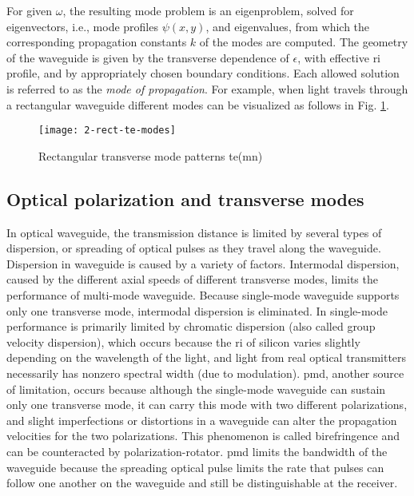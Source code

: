 \documentclass[../report.tex]{subfiles}
\begin{document}
For given $\omega$, the resulting mode problem is an eigenproblem, solved for eigenvectors, i.e., mode profiles $\psi(x, y)$, and eigenvalues, from which the corresponding propagation constants $k$ of the modes are computed. The geometry of the waveguide is given by the transverse dependence of $\epsilon$, with effective \gls{ri} profile, and by appropriately chosen boundary conditions. Each allowed solution is referred to as the \textit{mode of propagation}. For example, when light travels through a rectangular waveguide different modes can be visualized as follows in Fig. \ref{fig:2_rect_te_modes}.
\begin{figure}[H]
	\centering
	\texttt{[image: 2-rect-te-modes]}
	\caption{Rectangular transverse mode patterns \gls{te}(mn)}
	\label{fig:2_rect_te_modes}
\end{figure}
		
		\subsection{Optical polarization and transverse modes}
In optical waveguide, the transmission distance is limited by several types of dispersion, or spreading of optical pulses as they travel along the waveguide. Dispersion in waveguide is caused by a variety of factors. Intermodal dispersion, caused by the different axial speeds of different transverse modes, limits the performance of multi-mode waveguide. Because single-mode waveguide supports only one transverse mode, intermodal dispersion is eliminated. In single-mode performance is primarily limited by chromatic dispersion (also called group velocity dispersion), which occurs because the \gls{ri} of silicon varies slightly depending on the wavelength of the light, and light from real optical transmitters necessarily has nonzero spectral width (due to modulation). \gls{pmd}, another source of limitation, occurs because although the single-mode waveguide can sustain only one transverse mode, it can carry this mode with two different polarizations, and slight imperfections or distortions in a waveguide can alter the propagation velocities for the two polarizations. This phenomenon is called birefringence and can be counteracted by polarization-rotator. \gls{pmd} limits the bandwidth of the waveguide because the spreading optical pulse limits the rate that pulses can follow one another on the waveguide and still be distinguishable at the receiver.\par
\end{document}
